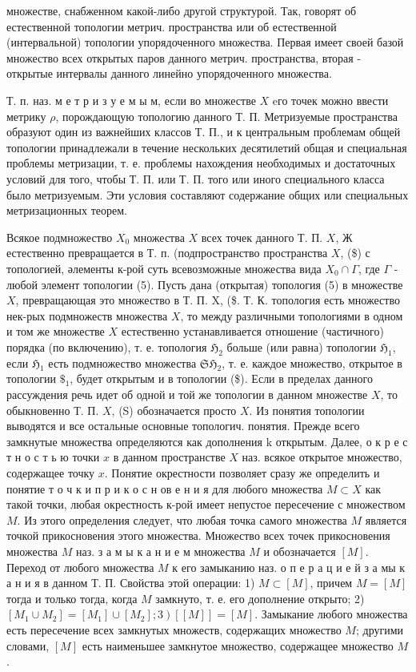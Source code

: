 \documentclass[10pt]{article}
\begin{document}
множестве, снабженном какой-либо другой структурой. Так, говорят об естественной топологии метрич. пространства или об естественной (интервальной) топологии упорядоченного множества. Первая имеет своей базой множество всех открытых паров данного метрич. пространства, вторая - открытые интервалы данного линейно упорядоченного множества.



Т. п. наз. м е т р и з у е м ы м, если во множестве $X$ eго точек можно ввести метрику $\rho$, порождающую топологию данного Т. П. Метризуемые пространства образуют один из важнейших классов Т. П., и к центральным проблемам общей топологии принадлежали в течение нескольких десятилетий общая и специальная проблемы метризации, т. е. проблемы нахождения необходимых и достаточных условий для того, чтобы Т. П. или Т. П. того или иного специального класса было метризуемым. Эти условия составляют содержание общих или специальных метризационных теорем.



Всякое подмножество $X_{0}$ множества $X$ всех точек данного Т. П. $X$, Ж естественно превращается в Т. п. (подпространство пространства $X$, (\$) с топологией, әлементы к-рой суть всевозможные множества вида $X_{0} \cap \Gamma$, где $\Gamma$ - любой элемент топологии (5). Пусть дана (открытая) топология (5) в множестве $X$, превращающая это множество в Т. П. X, (\$. Т. К. топология есть множество нек-рых подмножеств множества $X$, то между различными топологиями в одном и том же множестве $X$ естественно устанавливается отношение (частичного) порядка (по включению), т. е. топология $\mathfrak{H}_{2}$ больше (или равна) топологии $\mathfrak{H}_{1}$, если $\mathfrak{H}_{1}$ есть подмножество множества $\mathfrak{S H}_{2}$, т. е. каждое множество, открытое в топологии $\$_{1}$, будет открытым и в топологии (\$). Если в пределах данного рассуждения речь идет об одной и той же топологии в данном множестве $X$, то обыкновенно Т. П. $X$, (S) обозначается просто $X$. Из понятия топологии выводятся и все остальные основные топологич. понятия. Прежде всего замкнутые множества определяются как дополнения $\mathrm{k}$ открытым. Далее, о к р е с т н о с т ь ю точки $x$ в данном пространстве $X$ наз. всякое открытое множество, содержащее точку $x$. Понятие окрестности позволяет сразу же определить и понятие т о ч к и п р и к о с н ов е н и я для любого множества $M \subset X$ как такой точки, любая окрестность к-рой имеет непустое пересечение с множеством $M$. Из этого определения следует, что любая точка самого множества $M$ является точкой прикосновения этого множества. Множество всех точек прикосновения множества $M$ наз. з а м ы к а н и е м множества $M$ и обозначается $[M]$. Переход от любого множества $M$ к его замыканию наз. о п е р а ц и е й з а мы к а н и я в данном Т. П. Свойства этой операции: 1) $M \subset[M]$, причем $M=[M]$ тогда и только тогда, когда $M$ замкнуто, т. е. его дополнение открыто; 2) $\left.\left[M_{1} \cup M_{2}\right]=\left[M_{1}\right] \cup\left[M_{2}\right] ; 3\right)[[M]]=[M]$. Замыкание любого множества есть пересечение всех замкнутых множеств, содержащих множество $M$; другими словами, $[M]$ есть наименьшее замкнутое множество, содержащее множество $M$.
\end{document}
